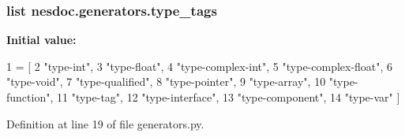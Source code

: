 \subsubsection[{\texorpdfstring{type\+\_\+tags}{type_tags}}]{\setlength{\rightskip}{0pt plus 5cm}list nesdoc.\+generators.\+type\+\_\+tags}\hypertarget{namespacenesdoc_1_1generators_a75a5cc95a5f7f528400a04896f23dded}{}\label{namespacenesdoc_1_1generators_a75a5cc95a5f7f528400a04896f23dded}
{\bfseries Initial value\+:}
\begin{DoxyCode}
1 = [
2   \textcolor{stringliteral}{"type-int"},
3   \textcolor{stringliteral}{"type-float"},
4   \textcolor{stringliteral}{"type-complex-int"},
5   \textcolor{stringliteral}{"type-complex-float"},
6   \textcolor{stringliteral}{"type-void"},
7   \textcolor{stringliteral}{"type-qualified"},
8   \textcolor{stringliteral}{"type-pointer"},
9   \textcolor{stringliteral}{"type-array"},
10   \textcolor{stringliteral}{"type-function"},
11   \textcolor{stringliteral}{"type-tag"},
12   \textcolor{stringliteral}{"type-interface"},
13   \textcolor{stringliteral}{"type-component"},
14   \textcolor{stringliteral}{"type-var"} ]
\end{DoxyCode}


Definition at line 19 of file generators.\+py.

